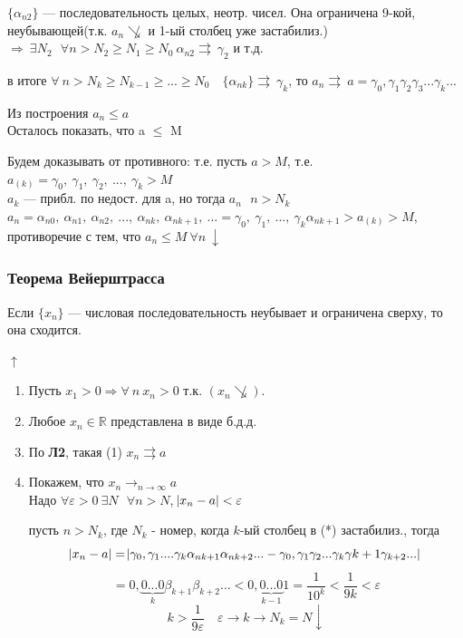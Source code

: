 \documentclass{article}
\begin{document}
    \(\{\alpha_{n2}\}\) --- последовательность целых, неотр. чисел. Она ограничена 9-кой, неубывающей(т.к. \(a_n \not\searrow\) и 1-ый столбец уже застабилиз.) \(\Rightarrow \ \exists N_2 \ \: \ \forall n > N_2 \geq N_1 \geq N_0 \ \alpha_{n2} \rightrightarrows\ \gamma_2\) и т.д.

    в итоге \( \forall\ n > N_k \geq N_{k-1} \geq ... \geq N_0\quad \{ \alpha_{nk} \} \rightrightarrows\ \gamma_k \), то \( a_n \rightrightarrows\ a = \gamma_0,\gamma_1\gamma_2\gamma_3...\gamma_k... \)
    
    Из построения \(a_n \leq a \)
    \\ Осталось показать, что a \(\leq\) M

    Будем доказывать от противного: т.е. пусть \(a > M\), т.е. \(a_{(k)} = \gamma_0,\ \gamma_1,\ \gamma_2,\ ...,\ \gamma_k > M\)
    \\ \(a_k\) --- прибл. по недост. для a, но тогда \(a_n \ \: \ n > N_k\)
    \\ \(a_n = \alpha_{n0},\ \alpha_{n1},\ \alpha_{n2},\ ...,\ \alpha_{nk},\ \alpha_{nk+1},\ ... = \gamma_0,\ \gamma_1,\ ...,\ \gamma_k\alpha_{nk+1} > a_{(k)} > M\), противоречие с тем, что \(a_n \leq M \ \forall n \ \downarrow\)

    \subsubsection{Теорема Вейерштрасса}

    Если \(\{ x_n \} \) --- числовая последовательность неубывает и ограничена сверху, то она сходится.

    \(\uparrow\)
    \begin{enumerate}
        \item Пусть \( x_1 > 0 \Rightarrow \forall\ n\ x_n > 0 \) т.к. \( (x_n \not\searrow ) \).

        \item Любое \( x_n \in \mathbb{R} \) представлена в виде б.д.д.

        \item По \textbf{Л2}, такая (1) \( x_n \rightrightarrows a \)

        \item Покажем, что \(x_n \longrightarrow_{n \rightarrow \infty} a\)
    \\ Надо \(\forall \varepsilon > 0 \ \exists N \ \: \ \forall n > N\), \(\abs{x_n - a} < \varepsilon\)

    пусть \( n > N_k \), где \( N_k \) - номер, когда \(k\)-ый столбец в (*) застабилиз., тогда 
    \[ \abs{x_n - a} = \abs{\gamma_0,\gamma_1....\gamma_k\alpha_{nk+1}\alpha_{nk+2}... - \gamma_0,\gamma_1\gamma_2...\gamma_k\gamma{k+1}\gamma_{k+2}...} \]
    \[ = 0,\underbrace{0...0}_k\beta_{k+1}\beta_{k+2}... < 0,\underbrace{0...0}_{k-1}1 = \frac{1}{10^k} < \frac{1}{9k} < \varepsilon \]
    \[k > \frac{1}{9\varepsilon}\quad \varepsilon \rightarrow k \rightarrow N_k = N \downarrow \]
    \end{enumerate}
\end{document}
